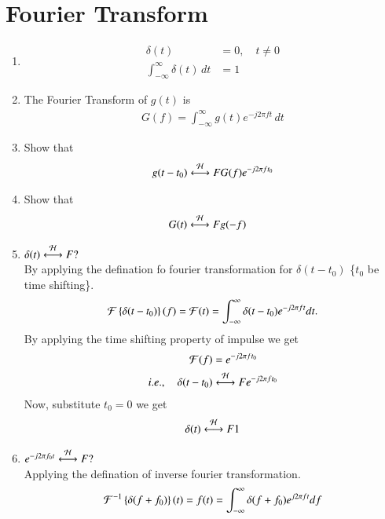 \documentclass[journal,12pt,twocolumn]{IEEEtran}
\renewcommand\thesection{\arabic{section}}
\begin{document}
\section{Fourier Transform}
\begin{enumerate}[label=\thesection.\arabic*
	,ref=\thesection.\theenumi]
	\item 
		\begin{align}
			\delta(t)&=0, \quad t\neq 0\\
			\int_{-\infty}^{\infty}\delta(t) \, dt&= 1
		\end{align}
	 \item The Fourier Transform of $g(t)$ is
	 \begin{align}
	 G(f)=\int_{-\infty}^{\infty}g(t)e^{-j2\pi ft}\,dt
	 \end{align}
	 \item Show that 
	 \begin{align}
		 g(t-t_0)&\overset{\mathcal{H}}{ \longleftrightarrow}{F}G(f)e^{-j2\pi ft_0}\\
	 \end{align}
	 \solution
	 \item Show that 
	 \begin{align} \label{duality}
		 G(t)&\overset{\mathcal{H}}{ \longleftrightarrow}{F}g(-f)
	 \end{align}
	 \solution
	 \item $\delta(t)\overset{\mathcal{H}}{ \longleftrightarrow}{F}?$\\
	 \solution By applying the defination fo fourier transformation for $\delta(t-t_0)$ \{$t_0$ be time shifting\}.
	 \begin{align}
		\mathcal{F}\left\{\delta(t-t_0)\right\}(f) = \mathcal{F}(t)= \int_{-\infty}^{\infty} \delta(t-t_0)e^{-j2\pi ft}dt.
	 \end{align}
	 By applying the time shifting property of impulse we get
	 \begin{align}
		\mathcal{F}(f) &= e^{-j2\pi ft_0}\\
		i.e., \quad \delta(t-t_0) &\overset{\mathcal{H}}{ \longleftrightarrow}{F} e^{-j2\pi ft_0}
	 \end{align}
	 Now, substitute $t_0 = 0$ we get 
	 \begin{align}
		\delta(t) \overset{\mathcal{H}}{ \longleftrightarrow}{F} 1
	 \end{align}
	 \item $e^{-j2\pi f_0t}\overset{\mathcal{H}}{ \longleftrightarrow}{F}?$\\
	 \solution Applying the defination of inverse fourier transformation.
	 \begin{align}
		\mathcal{F}^{-1}\left\{\delta(f+f_0)\right\}(t) = f(t)= \int_{-\infty}^{\infty}\delta(f+f_0)e^{j2\pi ft}df
	 \end{align}

\end{enumerate}
\end{document}
